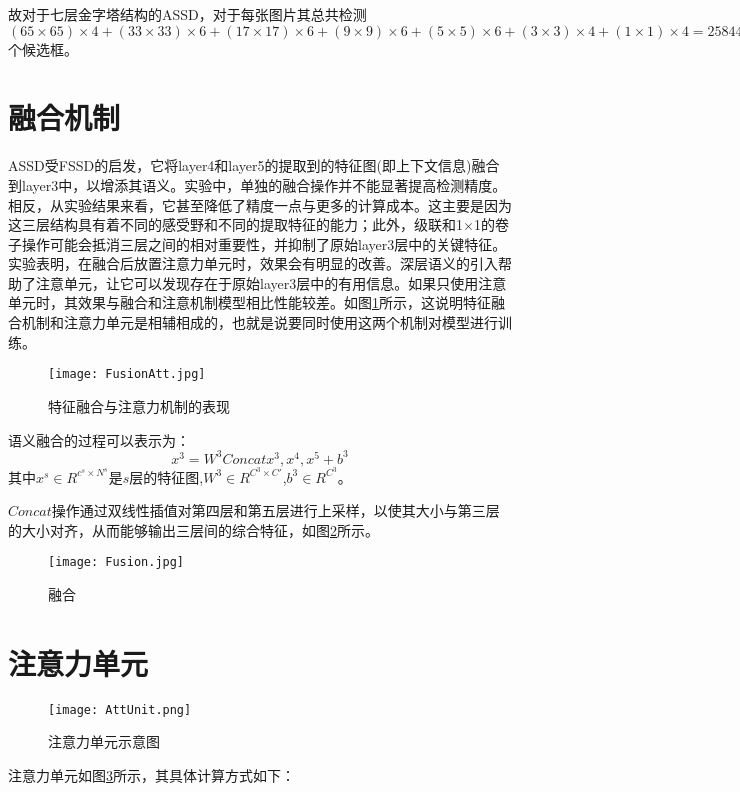 故对于七层金字塔结构的ASSD，对于每张图片其总共检测$(65×65)×4+(33×33)×6+(17×17)×6+(9×9)×6+(5×5)×6+(3×3)×4+(1×1)×4=25844$个候选框。


\section{融合机制}
ASSD受FSSD的启发，它将layer4和layer5的提取到的特征图(即上下文信息)融合到layer3中，以增添其语义。实验中，单独的融合操作并不能显著提高检测精度。相反，从实验结果来看，它甚至降低了精度一点与更多的计算成本。这主要是因为这三层结构具有着不同的感受野和不同的提取特征的能力；此外，级联和1$\times$1的卷子操作可能会抵消三层之间的相对重要性，并抑制了原始layer3层中的关键特征。实验表明，在融合后放置注意力单元时，效果会有明显的改善。深层语义的引入帮助了注意单元，让它可以发现存在于原始layer3层中的有用信息。如果只使用注意单元时，其效果与融合和注意机制模型相比性能较差。如图\ref{FusionAtt}所示，这说明特征融合机制和注意力单元是相辅相成的，也就是说要同时使用这两个机制对模型进行训练。

\begin{figure}
	\center
	{\texttt{[image: FusionAtt.jpg]}}
	\caption{特征融合与注意力机制的表现}
	\label{FusionAtt}
\end{figure}

语义融合的过程可以表示为：
\begin{equation}
	x^3=W^3Concat{x^3,x^4,x^5}+b^3
\end{equation}
其中$x^s\in R^{c^s\times N^s}$是$s$层的特征图,$W^3\in R^{C^3\times C'}$,$b^3\in R^{C^3}$。

$Concat$操作通过双线性插值对第四层和第五层进行上采样，以使其大小与第三层的大小对齐，从而能够输出三层间的综合特征，如图\ref{Fusion}所示。

\begin{figure}
	\center
	{\texttt{[image: Fusion.jpg]}}
	\caption{融合}
	\label{Fusion}
\end{figure}

\section{注意力单元}

\begin{figure}
	\center
	{\texttt{[image: AttUnit.png]}}
	\caption{注意力单元示意图}
	\label{AttUnit}
\end{figure}

注意力单元如图\ref{AttUnit}所示，其具体计算方式如下：

